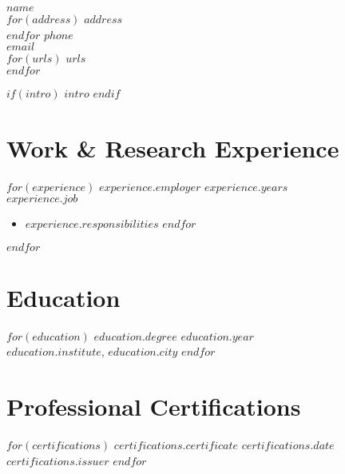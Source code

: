 \documentclass[$fontsize$, a4paper]{article}
\begin{document}
{\LARGE $name$}\\[2pt]

$for(address)$
$address$\\
$endfor$
$phone$\\
\href{mailto:$email$}{$email$}\\
$for(urls)$
\href{http://$urls$}{$urls$}\\
$endfor$

\vspace{8pt}

$if(intro)$
$intro$
$endif$

\vspace{8pt}

\section*{Work \& Research Experience}
\begin{multicols}{2}
\noindent
$for(experience)$
\textbf{$experience.employer$} \hfill \textit{$experience.years$}\\
\emph{$experience.job$}\\
\begin{itemize}
$for(experience.responsibilities)$
\item $experience.responsibilities$
$endfor$
\end{itemize}
\vspace{6pt}
$endfor$
\end{multicols}

\vspace{8pt}

\section*{Education}
\begin{multicols}{2}
$for(education)$
\textbf{$education.degree$} \hfill \textit{$education.year$}\\
$education.institute$, $education.city$
\vspace{6pt}
$endfor$
\end{multicols}

\vspace{8pt}

\section*{Professional Certifications}
\begin{multicols}{2}
$for(certifications)$
\textbf{$certifications.certificate$} \hfill \textit{$certifications.date$}\\
$certifications.issuer$
\vspace{6pt}
$endfor$
\end{multicols}
\end{document}
